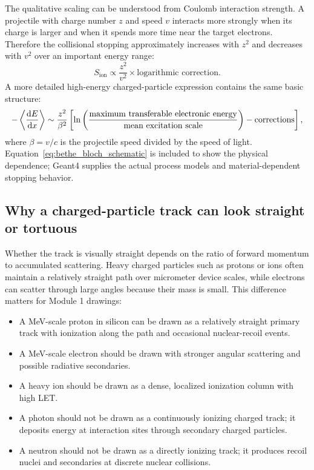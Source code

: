 \documentclass[11pt]{article}
\begin{document}
The qualitative scaling can be understood from Coulomb interaction strength. A projectile with charge number $z$ and speed $v$ interacts more strongly when its charge is larger and when it spends more time near the target electrons. Therefore the collisional stopping approximately increases with $z^2$ and decreases with $v^2$ over an important energy range:
\begin{equation}
S_{\mathrm{ion}} \propto \frac{z^2}{v^2}\times \text{logarithmic correction}.
\end{equation}
A more detailed high-energy charged-particle expression contains the same basic structure:
\begin{equation}
-\left<\dv{E}{x}\right>
\sim
\frac{z^2}{\beta^2}
\left[\ln\left(\frac{\text{maximum transferable electronic energy}}{\text{mean excitation scale}}\right)-\text{corrections}\right],
\label{eq:bethe_bloch_schematic}
\end{equation}
where $\beta=v/c$ is the projectile speed divided by the speed of light. Equation~\eqref{eq:bethe_bloch_schematic} is included to show the physical dependence; Geant4 supplies the actual process models and material-dependent stopping behavior.

\subsection{Why a charged-particle track can look straight or tortuous}

Whether the track is visually straight depends on the ratio of forward momentum to accumulated scattering. Heavy charged particles such as protons or ions often maintain a relatively straight path over micrometer device scales, while electrons can scatter through large angles because their mass is small. This difference matters for Module 1 drawings:
\begin{itemize}
\item A MeV-scale proton in silicon can be drawn as a relatively straight primary track with ionization along the path and occasional nuclear-recoil events.
\item A MeV-scale electron should be drawn with stronger angular scattering and possible radiative secondaries.
\item A heavy ion should be drawn as a dense, localized ionization column with high LET.
\item A photon should not be drawn as a continuously ionizing charged track; it deposits energy at interaction sites through secondary charged particles.
\item A neutron should not be drawn as a directly ionizing track; it produces recoil nuclei and secondaries at discrete nuclear collisions.
\end{itemize}
\end{document}
